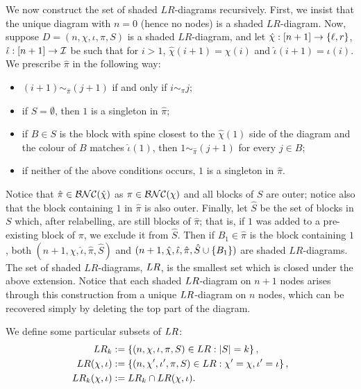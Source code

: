 We now construct the set of shaded $LR$-diagrams recursively.
First, we insist that the unique diagram with $n = 0$ (hence no nodes) is a shaded $LR$-diagram.
Now, suppose $D = (n, \chi, \iota, \pi, S)$ is a shaded $LR$-diagram, and let $\hat\chi : [n+1]\to\left\{\ell, r\right\}$, $\hat\iota : [n+1]\to\mathcal{I}$ be such that for $i > 1$, $\hat\chi(i+1) = \chi(i)$ and $\hat\iota(i+1) = \iota(i)$.
We prescribe $\hat\pi$ in the following way:
\begin{itemize}
	\item $(i+1) \sim_{\hat\pi} (j+1)$ if and only if $i \sim_\pi j$;
	\item if $S = \emptyset$, then $1$ is a singleton in $\hat\pi$;
	\item if $B \in S$ is the block with spine closest to the $\hat\chi(1)$ side of the diagram and the colour of $B$ matches $\hat\iota(1)$, then $1\sim_{\hat\pi} (j+1)$ for every $j \in B$;
	\item if neither of the above conditions occurs, $1$ is a singleton in $\hat\pi$. 
\end{itemize}
Notice that $\hat\pi \in \mathcal{BNC}(\hat\chi)$ as $\pi\in\mathcal{BNC}(\chi)$ and all blocks of $S$ are outer; notice also that the block containing $1$ in $\hat\pi$ is also outer.
Finally, let $\hat S$ be the set of blocks in $S$ which, after relabelling, are still blocks of $\hat\pi$; that is, if $1$ was added to a pre-existing block of $\pi$, we exclude it from $\hat S$.
Then if $B_1 \in \hat\pi$ is the block containing $1$, both $(n+1, \hat\chi, \hat\iota, \hat\pi, \hat S)$ and $(n+1, \hat\chi, \hat\iota, \hat\pi, \hat S\cup \left\{B_1\right\})$ are shaded $LR$-diagrams.
The set of shaded $LR$-diagrams, $LR$, is the smallest set which is closed under the above extension.
Notice that each shaded $LR$-diagram on $n+1$ nodes arises through this construction from a unique $LR$-diagram on $n$ nodes, which can be recovered simply by deleting the top part of the diagram.

We define some particular subsets of $LR$:
\begin{align*}
	LR_k &:= \left\{(n, \chi, \iota, \pi, S) \in LR : \left|S\right| = k\right\},\\
	LR(\chi, \iota) &:= \left\{(n, \chi', \iota', \pi, S) \in LR : \chi' = \chi, \iota' = \iota\right\},\\
	LR_k(\chi, \iota) &:= LR_k \cap LR(\chi, \iota).
\end{align*}

